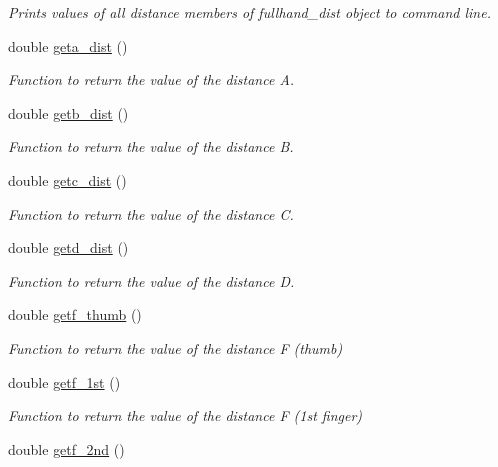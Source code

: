 \begin{DoxyCompactItemize}
\begin{DoxyCompactList}\small\item\em Prints values of all distance members of fullhand\_\-dist object to command line. \end{DoxyCompactList}\item 
double \hyperlink{classFullhand__dist_a45d4a58c409c55ec9c5f40ea1e9f4c95}{geta\_\-dist} ()
\begin{DoxyCompactList}\small\item\em Function to return the value of the distance A. \end{DoxyCompactList}\item 
double \hyperlink{classFullhand__dist_a5322cb52922742bf6cbb33384846fbe9}{getb\_\-dist} ()
\begin{DoxyCompactList}\small\item\em Function to return the value of the distance B. \end{DoxyCompactList}\item 
double \hyperlink{classFullhand__dist_a83173301dc8db4e86af78f68bfd2b989}{getc\_\-dist} ()
\begin{DoxyCompactList}\small\item\em Function to return the value of the distance C. \end{DoxyCompactList}\item 
double \hyperlink{classFullhand__dist_a9fbeb7da637297478a04bb5a716dcde2}{getd\_\-dist} ()
\begin{DoxyCompactList}\small\item\em Function to return the value of the distance D. \end{DoxyCompactList}\item 
double \hyperlink{classFullhand__dist_a228036c87117a86347da42f7eb7d28e7}{getf\_\-thumb} ()
\begin{DoxyCompactList}\small\item\em Function to return the value of the distance F (thumb) \end{DoxyCompactList}\item 
double \hyperlink{classFullhand__dist_a106efa780d272ba08224abaf467eb353}{getf\_\-1st} ()
\begin{DoxyCompactList}\small\item\em Function to return the value of the distance F (1st finger) \end{DoxyCompactList}\item 
double \hyperlink{classFullhand__dist_a64a532ed7396b8041dad5e3812f97f78}{getf\_\-2nd} ()

\end{DoxyCompactItemize}
